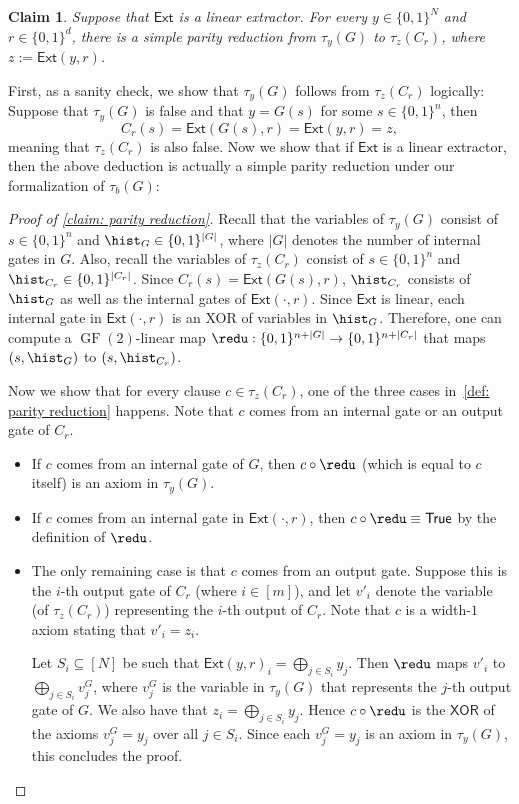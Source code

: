 \documentclass[10pt,a4paper]{article}
\newtheorem{claim}[theorem]{Claim}
\theoremstyle{definition}
\theoremstyle{remark}
\DeclareMathOperator{\GF}{GF}
\newcommand{\Ext}{\mathsf{Ext}}
\newcommand{\XOR}{\mathsf{XOR}}
\begin{document}
\begin{claim}\label{claim: parity reduction}
	Suppose that $\Ext$ is a linear extractor. For every $y\in\{0, 1\}^N$ and $r \in \{0, 1\}^d$, there is a simple parity reduction from $\tau_y(G)$ to $\tau_z(C_r)$, where $z := \Ext(y, r)$.
\end{claim}
First, as a sanity check, we show that $\tau_y(G)$ follows from $\tau_z(C_r)$ logically: Suppose that $\tau_y(G)$ is false and that $y = G(s)$ for some $s\in\{0, 1\}^n$, then
\[C_r(s) = \Ext(G(s), r) = \Ext(y, r) = z,\]
meaning that $\tau_z(C_r)$ is also false. Now we show that if $\Ext$ is a linear extractor, then the above deduction is actually a simple parity reduction under our formalization of $\tau_b(G)$:
\begin{proof}[Proof of \autoref{claim: parity reduction}]
	Recall that the variables of $\tau_y(G)$ consist of $s\in\{0, 1\}^n$ and $\hist_G\in\{0, 1\}^{|G|}$, where $|G|$ denotes the number of internal gates in $G$. Also, recall the variables of $\tau_z(C_r)$ consist of $s\in\{0, 1\}^n$ and $\hist_{C_r}\in\{0, 1\}^{|C_r|}$. Since $C_r(s) = \Ext(G(s), r)$, $\hist_{C_r}$ consists of $\hist_G$ as well as the internal gates of $\Ext(\cdot, r)$. Since $\Ext$ is linear, each internal gate in $\Ext(\cdot, r)$ is an XOR of variables in $\hist_G$. Therefore, one can compute a $\GF(2)$-linear map $\redu: \{0, 1\}^{n + |G|} \to \{0, 1\}^{n + |C_r|}$ that maps $(s, \hist_G)$ to $(s, \hist_{C_r})$.

	Now we show that for every clause $c \in \tau_z(C_r)$, one of the three cases in~\autoref{def: parity reduction} happens. Note that $c$ comes from an internal gate or an output gate of $C_r$.\begin{itemize}
		\item If $c$ comes from an internal gate of $G$, then $c\circ \redu$ (which is equal to $c$ itself) is an axiom in $\tau_y(G)$.
		\item If $c$ comes from an internal gate in $\Ext(\cdot, r)$, then $c\circ \redu \equiv {\sf True}$ by the definition of $\redu$.
		\item The only remaining case is that $c$ comes from an output gate. Suppose this is the $i$-th output gate of $C_r$ (where $i\in[m]$), and let $v'_i$ denote the variable (of $\tau_z(C_r)$) representing the $i$-th output of $C_r$. Note that $c$ is a width-$1$ axiom stating that $v'_i = z_i$.
        
        Let $S_i \subseteq [N]$ be such that $\Ext(y, r)_i = \bigoplus_{j\in S_i}y_j$. Then $\redu$ maps $v'_i$ to $\bigoplus_{j\in S_i}v^G_j$, where $v^G_j$ is the variable in $\tau_y(G)$ that represents the $j$-th output gate of $G$. We also have that $z_i = \bigoplus_{j\in S_i}y_j$. Hence $c\circ\redu$ is the $\XOR$ of the axioms $v^G_j = y_j$ over all $j\in S_i$. Since each $v^G_j = y_j$ is an axiom in $\tau_y(G)$, this concludes the proof. \qedhere
	\end{itemize}
\end{proof}
\end{document}
